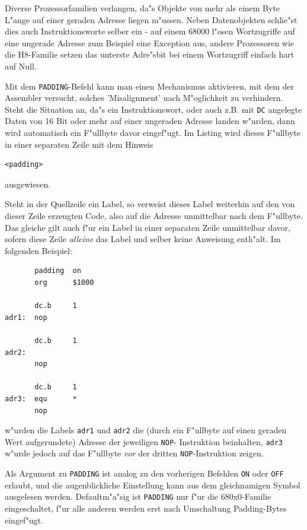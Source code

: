 \documentclass[12pt,a4paper,twoside]{report}
\newcommand{\tty}[1]{{\tt #1}}
\begin{document}
Diverse Prozessorfamilien verlangen, da"s Objekte von mehr als einem
Byte L"ange auf einer geraden Adresse liegen m"ussen.  Neben Datenobjekten
schlie"st dies auch Instruktionsworte selber ein - auf einem 68000
l"osen Wortzugriffe auf eine ungerade Adresse zum Beispiel eine
Exception aus, andere Prozessoren wie die H8-Familie setzen das
unterste Adre"sbit bei einem Wortzugriff einfach hart auf Null.

Mit dem \tty{PADDING}-Befehl kann man einen Mechanismus aktivieren,
mit dem der Assembler versucht, solches 'Misalignment' nach M"oglichkeit
zu verhindern.  Steht die Situation an, da"s ein Instruktionswort,
oder auch z.B. mit \tty{DC} angelegte Daten von 16 Bit oder mehr auf
einer ungeraden Adresse landen w"urden, dann wird automatisch ein F"ullbyte
davor eingef"ugt.  Im Listing wird dieses F"ullbyte in einer separaten
Zeile mit dem Hinweis
\begin{verbatim}
<padding>
\end{verbatim}
ausgewiesen.

Steht in der Quellzeile ein Label, so verweist dieses Label weiterhin
auf den von dieser Zeile erzeugten Code, also auf die Adresse unmittelbar
nach dem F"ullbyte.  Das gleiche gilt auch f"ur ein Label in einer
separaten Zeile unmittelbar davor, sofern diese Zeile {\em alleine} das
Label und selber keine Anweisung enth"alt.  Im folgenden Beispiel:
\begin{verbatim}
       padding  on
       org      $1000

       dc.b     1
adr1:  nop

       dc.b     1
adr2:
       nop

       dc.b     1
adr3:  equ      *
       nop
\end{verbatim}
w"urden die Labels \tty{adr1} und \tty{adr2} die (durch ein F"ullbyte
auf einen geraden Wert aufgerundete) Adresse der jeweiligen \tty{NOP}-
Instruktion beinhalten, \tty{adr3} w"urde jedoch auf das F"ullbyte {\em vor}
der dritten \tty{NOP}-Instruktion zeigen.

Als Argument zu \tty{PADDING} ist analog zu den vorherigen Befehlen
\tty{ON} oder \tty{OFF} erlaubt, und die augenblickliche Einstellung
kann aus dem gleichnamigen Symbol ausgelesen werden. Defaultm"a"sig
ist \tty{PADDING} nur f"ur die 680x0-Familie eingeschaltet, f"ur alle
anderen werden erst nach Umschaltung Padding-Bytes eingef"ugt.

\end{document}
